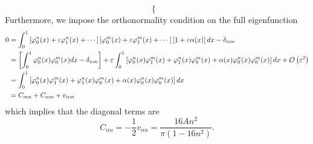 \begin{enumerate}[(i)]
{\begin{equation}
\begin{cases}
        \end{cases}
    \end{equation}
    Furthermore, we impose the orthonormality condition on the full eigenfunction 
    \begin{equation}
    \begin{aligned}
        0 &= \int_0^1 
        \left[\varphi_0^n(x) + \varepsilon \varphi_1^n(x) + \cdots \right] 
        \left[\varphi_0^m(x) + \varepsilon \varphi_1^m(x) + \cdots \right] 
        \left[1 + \varepsilon \alpha(x) \right] dx - \delta_{nm} \\
        &= 
        \left[\int_0^1 \varphi_0^n(x) \varphi_0^m(x) dx - \delta_{nm}\right] 
        + \varepsilon \int_0^1 \left[\varphi_0^n(x) \varphi_1^m(x) + \varphi_1^n(x) \varphi_0^m(x) + \alpha(x) \varphi_0^n(x) \varphi_0^m(x) \right] dx 
        + \mathcal{O} \left( \varepsilon^2 \right) \\
        &= \int_0^1 \left[\varphi_0^n(x) \varphi_1^m(x) + \varphi_1^n(x) \varphi_0^m(x) + \alpha(x) \varphi_0^n(x) \varphi_0^m(x)\right] dx \\
        &= C_{mn} + C_{nm} + v_{nm}
    \end{aligned}
    \end{equation}
    which implies that the diagonal terms are
    \begin{equation}
        C_{nn} = -\frac{1}{2}v_{nn} = \frac{16 A n^2}{\pi(1 - 16n^2)}.
    \end{equation}

}
\end{enumerate}
